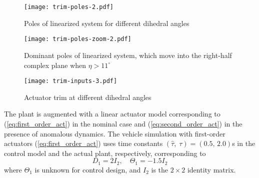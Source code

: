 \begin{figure}[htbp]
	\centering
	\texttt{[image: trim-poles-2.pdf]}
	\caption{Poles of linearized system for different dihedral angles}
	\label{fig:trim-poles}
\end{figure}

\begin{figure}[htbp]
	\centering
	\texttt{[image: trim-poles-zoom-2.pdf]}
	\caption{Dominant poles of linearized system, which move into the right-half complex plane when $\eta > 11^\circ$}
	\label{fig:trim-poles-zoom}
\end{figure}

\begin{figure}[htbp]
	\centering
	\texttt{[image: trim-inputs-3.pdf]}
	\caption{Actuator trim at different dihedral angles}
	\label{fig:trim-inputs}
\end{figure}

The plant is augmented with a linear actuator model corresponding to (\ref{eq:first_order_act}) in the nominal case and (\ref{eq:second_order_act}) in the presence of anomalous dynamics. The vehicle simulation with first-order actuators (\ref{eq:first_order_act}) uses time constants $(\hat{\tau},\;\tau) = (0.5,\,2.0)$s in the control model and the actual plant, respectively, corresponding to
\begin{equation}
D_1 = 2 I_2, \quad \Theta_1 = -1.5 I_2 \label{eq:theta_1}
\end{equation}
where $\Theta_1$ is unknown for control design, and $I_2$ is the $2 \times 2$ identity matrix. 

